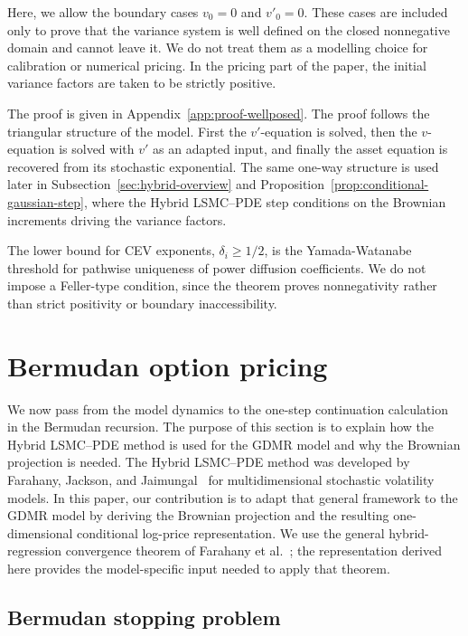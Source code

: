 \documentclass[pdflatex,sn-mathphys-num]{sn-jnl}
\theoremstyle{thmstyleone}%
\theoremstyle{thmstylethree}%
\theoremstyle{thmstyletwo}%
\begin{document}
Here, we allow the boundary cases $v_0=0$ and $v'_0=0$. These cases are included only to prove that the variance system is well defined on the closed nonnegative domain and cannot leave it. We do not treat them as a modelling choice for calibration or numerical pricing. In the pricing part of the paper, the initial variance factors are taken to be strictly positive.

The proof is given in Appendix~\ref{app:proof-wellposed}. The proof follows the triangular structure of the model.
First the $v'$-equation is solved, then the $v$-equation is solved with $v'$ as
an adapted input, and finally the asset equation is recovered from its
stochastic exponential. The same one-way structure is used later in
Subsection~\ref{sec:hybrid-overview} and
Proposition~\ref{prop:conditional-gaussian-step}, where the Hybrid LSMC--PDE
step conditions on the Brownian increments driving the variance factors.

The lower bound for CEV exponents, $\delta_i\ge1/2$,  is the Yamada-Watanabe threshold for
pathwise uniqueness of power diffusion coefficients. We do not impose a
Feller-type condition, since the theorem proves nonnegativity rather than strict
positivity or boundary inaccessibility.

\section{Bermudan option pricing}\label{sec:conditional_pde}

We now pass from the model dynamics to the one-step continuation calculation in
the Bermudan recursion. The purpose of this section is to explain how the Hybrid LSMC--PDE method is used for the GDMR model and why the Brownian projection is needed.
The Hybrid LSMC--PDE method was developed by Farahany, Jackson, and Jaimungal~\cite{farahany2020mixing} for multidimensional stochastic volatility models. In this paper, our contribution is to adapt that general framework to the GDMR model by deriving the Brownian projection and the resulting one-dimensional conditional log-price representation. We use the
general hybrid-regression convergence theorem of Farahany et al.~\cite{farahany2020mixing}; the representation derived here provides the
model-specific input needed to apply that theorem.

\subsection{Bermudan stopping problem}\label{sec:bermudan-recursion}
\end{document}
